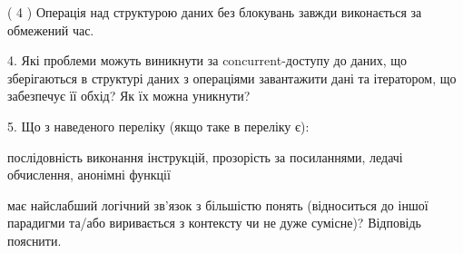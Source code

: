 \documentclass[12pt, ukrainian]{article}
\begin{document}
\begin {large}
{( 4 ) Операція над структурою даних без блокувань завжди виконається за обмежений час.%


\vspace{5mm}
4. Які проблеми можуть виникнути за concurrent-доступу до даних, що зберігаються в структурі даних з операціями завантажити дані та ітератором, що забезпечує її обхід? Як їх можна уникнути?



\vspace{5mm}
5. Що з наведеного переліку (якщо таке в переліку є):

\vspace{4mm}
\qquad послідовність виконання інструкцій, прозорість за посиланнями, ледачі обчислення, анонімні функції

\vspace{4mm}
має найслабший логічний зв’язок з більшістю понять (відноситься до іншої парадигми та/або виривається з контексту чи не дуже сумісне)? Відповідь пояснити.

}
\end {large}
\end{document}
